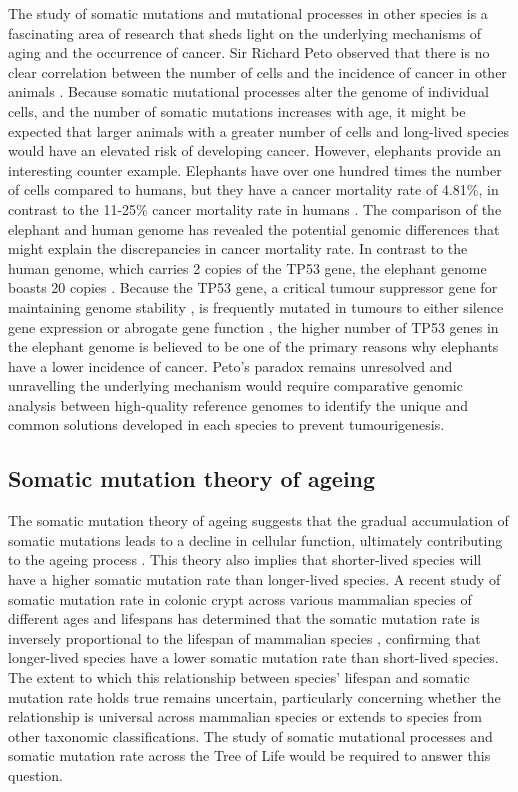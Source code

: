 The study of somatic mutations and mutational processes in other species is a fascinating area of research that sheds light on the underlying mechanisms of aging and the occurrence of cancer. Sir Richard Peto observed that there is no clear correlation between the number of cells and the incidence of cancer in other animals \cite{Peto2016-wf, Vincze2022-tw}. Because somatic mutational processes alter the genome of individual cells, and the number of somatic mutations increases with age, it might be expected that larger animals with a greater number of cells and long-lived species would have an elevated risk of developing cancer. However, elephants provide an interesting counter example. Elephants have over one hundred times the number of cells compared to humans, but they have a cancer mortality rate of 4.81\%, in contrast to the 11-25\% cancer mortality rate in humans \cite{Abegglen2015-ao}. The comparison of the elephant and human genome has revealed the potential genomic differences that might explain the discrepancies in cancer mortality rate. In contrast to the human genome, which carries 2 copies of the TP53 gene, the elephant genome boasts 20 copies \cite{Sulak2016-ld}. Because the TP53 gene, a critical tumour suppressor gene for maintaining genome stability \cite{Vousden2009-wd}, is frequently mutated in tumours to either silence gene expression or abrogate gene function \cite{}, the higher number of TP53 genes in the elephant genome is believed to be one of the primary reasons why elephants have a lower incidence of cancer. Peto’s paradox remains unresolved and unravelling the underlying mechanism would require comparative genomic analysis between high-quality reference genomes to identify the unique and common solutions developed in each species to prevent tumourigenesis. 

\subsection{Somatic mutation theory of ageing}

The somatic mutation theory of ageing suggests that the gradual accumulation of somatic mutations leads to a decline in cellular function, ultimately contributing to the ageing process \cite{Szilard1959-ru}. This theory also implies that shorter-lived species will have a higher somatic mutation rate than longer-lived species. A recent study of somatic mutation rate in colonic crypt across various mammalian species of different ages and lifespans has determined that the somatic mutation rate is inversely proportional to the lifespan of mammalian species \cite{Cagan2022-yn}, confirming that longer-lived species have a lower somatic mutation rate than short-lived species. The extent to which this relationship between species’ lifespan and somatic mutation rate holds true remains uncertain, particularly concerning whether the relationship is universal across mammalian species or extends to species from other taxonomic classifications. The study of somatic mutational processes and somatic mutation rate across the Tree of Life would be required to answer this question. 

